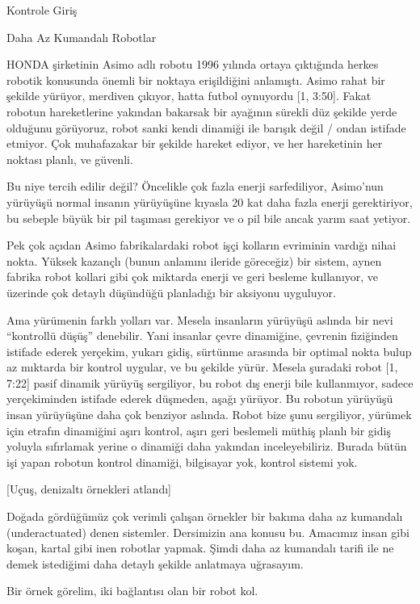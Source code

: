 \documentclass[12pt,fleqn]{article}\usepackage{../../common}
\begin{document}
Kontrole Giriş

Daha Az Kumandalı Robotlar 

HONDA şirketinin Asimo adlı robotu 1996 yılında ortaya çıktığında herkes
robotik konusunda önemli bir noktaya erişildiğini anlamıştı. Asimo rahat
bir şekilde yürüyor, merdiven çıkıyor, hatta futbol oynuyordu [1,
3:50]. Fakat robotun hareketlerine yakından bakarsak bir ayağının sürekli
düz şekilde yerde olduğunu görüyoruz, robot sanki kendi dinamiği ile
barışık değil / ondan istifade etmiyor. Çok muhafazakar bir şekilde hareket
ediyor, ve her hareketinin her noktası planlı, ve güvenli. 

Bu niye tercih edilir değil? Öncelikle çok fazla enerji sarfediliyor,
Asimo'nun yürüyüşü normal insanın yürüyüşüne kıyasla 20 kat daha fazla
enerji gerektiriyor, bu sebeple büyük bir pil taşıması gerekiyor ve o pil
bile ancak yarım saat yetiyor. 

Pek çok açıdan Asimo fabrikalardaki robot işçi kolların evriminin vardığı
nihai nokta. Yüksek kazançlı (bunun anlamını ileride göreceğiz) bir sistem,
aynen fabrika robot kollari gibi çok miktarda enerji ve geri besleme
kullanıyor, ve üzerinde çok detaylı düşündüğü planladığı bir aksiyonu
uyguluyor.

Ama yürümenin farklı yolları var. Mesela insanların yürüyüşü aslında bir
nevi ``kontrollü düşüş'' denebilir. Yani insanlar çevre dinamiğine,
çevrenin fiziğinden istifade ederek yerçekim, yukarı gidiş, sürtünme
arasında bir optimal nokta bulup az mıktarda bir kontrol uygular, ve bu
şekilde yürür. Mesela şuradaki robot [1, 7:22] pasif dinamik yürüyüş
sergiliyor, bu robot dış enerji bile kullanmıyor, sadece yerçekiminden
istifade ederek düşmeden, aşağı yürüyor. Bu robotun yürüyüşü insan
yürüyüşüne daha çok benziyor aslında. Robot bize şunu sergiliyor, yürümek
için etrafın dinamiğini aşırı kontrol, aşırı geri beslemeli müthiş planlı
bir gidiş yoluyla sıfırlamak yerine o dinamiği daha yakından
inceleyebiliriz. Burada bütün işi yapan robotun kontrol dinamiği,
bilgisayar yok, kontrol sistemi yok.

[Uçuş, denizaltı örnekleri atlandı]

Doğada gördüğümüz çok verimli çalışan örnekler bir bakıma daha az kumandalı
(underactuated) denen sistemler. Dersimizin ana konusu bu. Amacımız insan
gibi koşan, kartal gibi inen robotlar yapmak.  Şimdi daha az kumandalı
tarifi ile ne demek istediğimi daha detaylı şekilde anlatmaya uğrasayım.

Bir örnek görelim, iki bağlantısı olan bir robot kol. 
\end{document}
